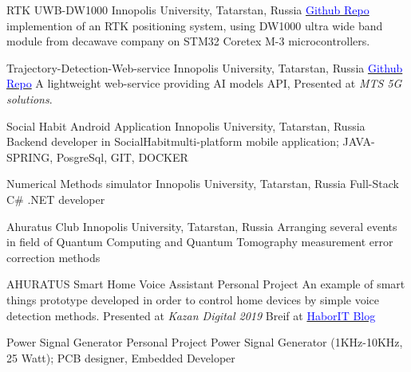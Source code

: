    {RTK UWB-DW1000}
    {Innopolis University, Tatarstan, Russia}{}{}
    {\href{https://github.com/Ehsan2754/RTK-DW1000/tree/main/Client}{\textcolor{blue}{Github Repo}}  implemention of an RTK positioning system, using DW1000 ultra wide band module from decawave company on STM32 Coretex M-3 microcontrollers.}

    {Trajectory-Detection-Web-service }
    {Innopolis University, Tatarstan, Russia}{}{}
    {\href{https://github.com/Ahuratus/Trajectory-Detection-Web-services/tree/main/web}{\textcolor{blue}{Github Repo}} A lightweight web-service providing AI models API, Presented  at \textit{MTS 5G solutions}. }

    {Social Habit Android Application}
    {Innopolis University, Tatarstan, Russia}{}{}
    {Backend developer in SocialHabit\texttrademark multi-platform mobile application; JAVA-SPRING, PosgreSql, GIT, DOCKER}
    

    {Numerical Methods simulator}
    {Innopolis University, Tatarstan, Russia}{}{}
    {Full-Stack C\# .NET developer}


    {Ahuratus Club}
    {Innopolis University, Tatarstan, Russia}{}{}
    {Arranging several events in field of Quantum Computing and Quantum Tomography measurement error correction methods}

    {AHURATUS Smart Home Voice Assistant}
    {Personal Project}{}{}
    {An example of smart things prototype developed in order to control home devices by simple voice detection methods. Presented at \textit{Kazan Digital 2019} Breif at \href{https://habr.com/en/post/475960/}{\textcolor{blue}{Habor\texttrademark IT Blog}}}

    {Power Signal Generator}
    {Personal Project}{}{}
    {Power Signal Generator (1KHz-10KHz, 25 Watt); PCB designer, Embedded Developer}
